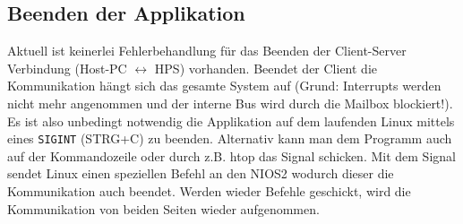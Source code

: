 \subsection{Beenden der Applikation}
Aktuell ist keinerlei Fehlerbehandlung für das Beenden der Client-Server Verbindung (Host-PC $\leftrightarrow$ \ac{HPS}) vorhanden. Beendet der Client die Kommunikation hängt sich das gesamte System auf (Grund: Interrupts werden nicht mehr angenommen und der interne Bus wird durch die Mailbox blockiert!). Es ist also unbedingt notwendig die Applikation auf dem laufenden Linux mittels eines \lstinline|SIGINT| (STRG+C) zu beenden. Alternativ kann man dem Programm auch auf der Kommandozeile oder durch z.B. htop das Signal schicken. Mit dem Signal sendet Linux einen speziellen Befehl an den NIOS2 wodurch dieser die Kommunikation auch beendet. Werden wieder Befehle geschickt, wird die Kommunikation von beiden Seiten wieder aufgenommen.
